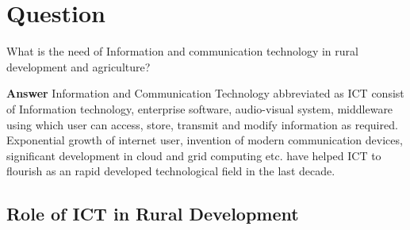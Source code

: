 \documentclass[12pt]{homework}
\begin{document}
\maketitle

\section{Question}
  What is the need of Information and communication technology in rural development and agriculture?

 


\textbf{Answer}
Information and Communication Technology abbreviated as ICT consist of Information technology, enterprise software, audio-visual system, middleware using which user can access, store, transmit and modify information as required. Exponential growth of internet user, invention of modern communication devices, significant development in cloud and grid computing etc. have helped ICT to flourish as an rapid developed technological field in the last decade. \\

\subsection{Role of ICT in Rural Development}
\end{document}
